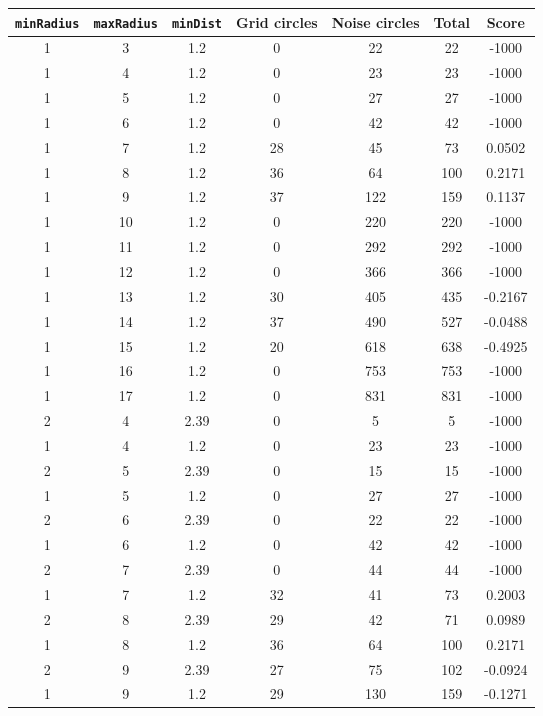 \documentclass[letterpaper, 12pt]{article}
\begin{document}
\begin{longtable}{|c|c|c|c|c|c|c|}
\hline
\textbf{\texttt{minRadius}} & \textbf{\texttt{maxRadius}} & \textbf{\texttt{minDist}} & \textbf{Grid circles} & \textbf{Noise circles} & \textbf{Total} & \textbf{Score} \\
\hline
1 & 3 & 1.2 & 0 & 22 & 22 & -1000 \\
\hline
1 & 4 & 1.2 & 0 & 23 & 23 & -1000 \\
\hline
1 & 5 & 1.2 & 0 & 27 & 27 & -1000 \\
\hline
1 & 6 & 1.2 & 0 & 42 & 42 & -1000 \\
\hline
1 & 7 & 1.2 & 28 & 45 & 73 & 0.0502 \\
\hline
1 & 8 & 1.2 & 36 & 64 & 100 & 0.2171 \\
\hline
1 & 9 & 1.2 & 37 & 122 & 159 & 0.1137 \\
\hline
1 & 10 & 1.2 & 0 & 220 & 220 & -1000 \\
\hline
1 & 11 & 1.2 & 0 & 292 & 292 & -1000 \\
\hline
1 & 12 & 1.2 & 0 & 366 & 366 & -1000 \\
\hline
1 & 13 & 1.2 & 30 & 405 & 435 & -0.2167 \\
\hline
1 & 14 & 1.2 & 37 & 490 & 527 & -0.0488 \\
\hline
1 & 15 & 1.2 & 20 & 618 & 638 & -0.4925 \\
\hline
1 & 16 & 1.2 & 0 & 753 & 753 & -1000 \\
\hline
1 & 17 & 1.2 & 0 & 831 & 831 & -1000 \\
\hline
2 & 4 & 2.39 & 0 & 5 & 5 & -1000 \\
\hline
1 & 4 & 1.2 & 0 & 23 & 23 & -1000 \\
\hline
2 & 5 & 2.39 & 0 & 15 & 15 & -1000 \\
\hline
1 & 5 & 1.2 & 0 & 27 & 27 & -1000 \\
\hline
2 & 6 & 2.39 & 0 & 22 & 22 & -1000 \\
\hline
1 & 6 & 1.2 & 0 & 42 & 42 & -1000 \\
\hline
2 & 7 & 2.39 & 0 & 44 & 44 & -1000 \\
\hline
1 & 7 & 1.2 & 32 & 41 & 73 & 0.2003 \\
\hline
2 & 8 & 2.39 & 29 & 42 & 71 & 0.0989 \\
\hline
1 & 8 & 1.2 & 36 & 64 & 100 & 0.2171 \\
\hline
2 & 9 & 2.39 & 27 & 75 & 102 & -0.0924 \\
\hline
1 & 9 & 1.2 & 29 & 130 & 159 & -0.1271 \\

\end{longtable}
\end{document}
